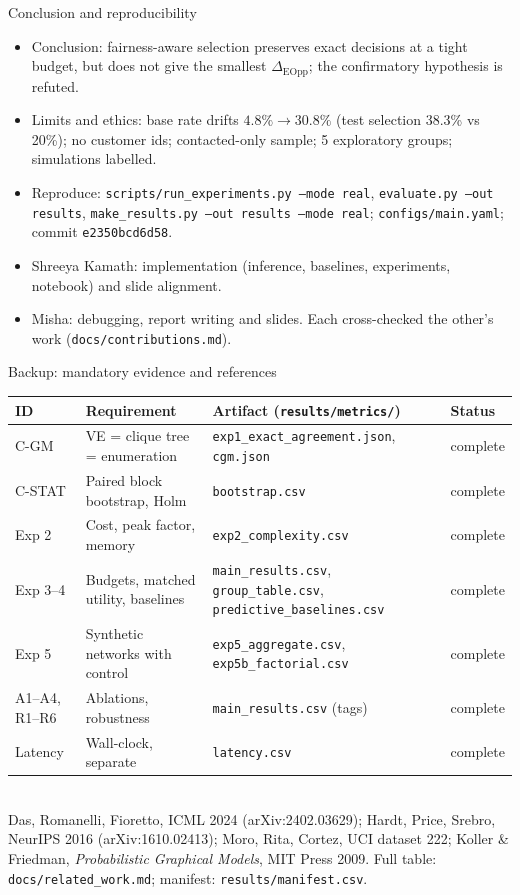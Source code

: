 \documentclass[aspectratio=169,11pt]{beamer}
\begin{document}
\begin{frame}{Conclusion and reproducibility}
\begin{itemize}
\item Conclusion: fairness-aware selection preserves exact decisions at a tight budget, but does not give the smallest $\Delta_{\mathrm{EOpp}}$; the confirmatory hypothesis is refuted.
\item Limits and ethics: base rate drifts $4.8\%\to30.8\%$ (test selection 38.3\% vs 20\%); no customer ids; contacted-only sample; 5 exploratory groups; simulations labelled.
\item Reproduce: \texttt{scripts/run\_experiments.py --mode real}, \texttt{evaluate.py --out results}, \texttt{make\_results.py --out results --mode real}; \texttt{configs/main.yaml}; commit \texttt{e2350bcd6d58}.
\item Shreeya Kamath: implementation (inference, baselines, experiments, notebook) and slide alignment.
\item Misha: debugging, report writing and slides. Each cross-checked the other's work (\texttt{docs/contributions.md}).
\end{itemize}
\end{frame}
\appendix
\begin{frame}{Backup: mandatory evidence and references}
\footnotesize
\begin{tabularx}{\linewidth}{llXl}\toprule
ID & Requirement & Artifact (\texttt{results/metrics/}) & Status\\\midrule
C-GM & VE = clique tree = enumeration & \texttt{exp1\_exact\_agreement.json}, \texttt{cgm.json} & complete\\
C-STAT & Paired block bootstrap, Holm & \texttt{bootstrap.csv} & complete\\
Exp 2 & Cost, peak factor, memory & \texttt{exp2\_complexity.csv} & complete\\
Exp 3--4 & Budgets, matched utility, baselines & \texttt{main\_results.csv}, \texttt{group\_table.csv}, \texttt{predictive\_baselines.csv} & complete\\
Exp 5 & Synthetic networks with control & \texttt{exp5\_aggregate.csv}, \texttt{exp5b\_factorial.csv} & complete\\
A1--A4, R1--R6 & Ablations, robustness & \texttt{main\_results.csv} (tags) & complete\\
Latency & Wall-clock, separate & \texttt{latency.csv} & complete\\\bottomrule
\end{tabularx}\\[4pt]
Das, Romanelli, Fioretto, ICML 2024 (arXiv:2402.03629); Hardt, Price, Srebro, NeurIPS 2016 (arXiv:1610.02413); Moro, Rita, Cortez, UCI dataset 222; Koller \& Friedman, \emph{Probabilistic Graphical Models}, MIT Press 2009. Full table: \texttt{docs/related\_work.md}; manifest: \texttt{results/manifest.csv}.
\end{frame}
\end{document}
